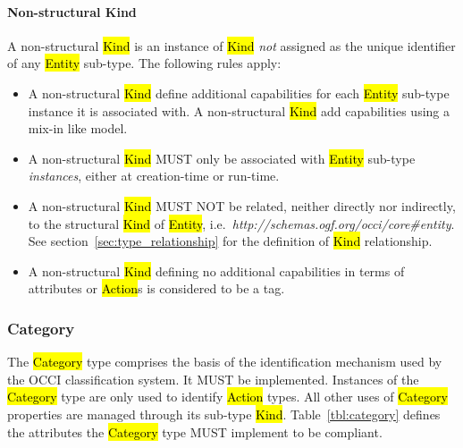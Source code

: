 \documentclass[10pt,a4paper,british]{article}
\begin{document}
\paragraph*{Non-structural Kind} A non-structural \hl{Kind} is an instance of
\hl{Kind} {\em not} assigned as the unique identifier of any \hl{Entity} sub-type.
The following rules apply:
\begin{itemize}
\item A non-structural \hl{Kind} define additional capabilities for each
 \hl{Entity} sub-type instance it is associated with. A non-structural \hl{Kind}
 add capabilities using a mix-in like model.
\item A non-structural \hl{Kind} MUST only be associated with \hl{Entity}
 sub-type {\em instances}, either at creation-time or run-time.
\item A non-structural \hl{Kind} MUST NOT be related, neither directly nor
 indirectly, to the structural \hl{Kind} of \hl{Entity},
 i.e.~\textit{http://schemas.ogf.org/occi/core\#entity}.
 See section~\ref{sec:type_relationship} for the definition of \hl{Kind}
 relationship.
\item A non-structural \hl{Kind} defining no additional capabilities in terms
 of attributes or \hl{Action}s is considered to be a tag.
\end{itemize}

\subsubsection{Category}
\label{sec:category}
The \hl{Category} type comprises the basis of the identification mechanism used
by the OCCI classification system. It MUST be implemented. Instances of the
\hl{Category} type are only used to identify \hl{Action} types. All other uses
of \hl{Category} properties are managed through its sub-type \hl{Kind}.
%
Table~\ref{tbl:category} defines the attributes the \hl{Category} type MUST
implement to be compliant.

\end{document}
